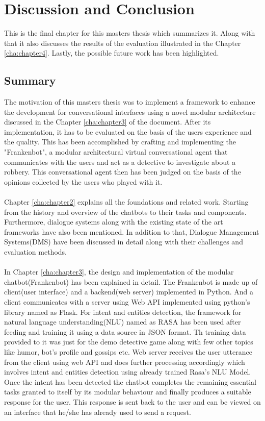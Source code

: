 \chapter{Discussion and Conclusion\label{cha:chapter5}}
This is the final chapter for this masters thesis which summarizes it. Along with that it also discusses the results of the evaluation illustrated in the Chapter \ref{cha:chapter4}. Lastly, the possible future work has been highlighted.

\section{Summary}
The motivation of this masters thesis was to implement a framework to enhance the development for conversational interfaces using a novel modular architecture discussed in the Chapter \ref{cha:chapter3} of the document. After its implementation, it has to be evaluated on the basis of the users experience and the quality. This has been accomplished by crafting and implementing the "Frankenbot", a modular architectural virtual conversational agent that communicates with the users and act as a detective to investigate about a robbery. This conversational agent then has been judged on the basis of the opinions collected by the users who played with it.
\\~\\
Chapter \ref{cha:chapter2} explains all the foundations and related work. Starting from the history and overview of the chatbots to their tasks and components. Furthermore, dialogue systems along with the existing state of the art frameworks have also been mentioned. In addition to that, Dialogue Management Systems(DMS) have been discussed in detail along with their challenges and evaluation methods.
\\~\\
In Chapter \ref{cha:chapter3}, the design and implementation of the modular chatbot(Frankenbot) has been explained in detail. The Frankenbot is made up of client(user interface) and a backend(web server) implemented in Python. And a client communicates with a server using Web API implemented using python's library named as Flask. For intent and entities detection, the framework for natural language understanding(NLU) named as RASA has been used after feeding and training it using a data source in JSON format. Th training data provided to it was just for the demo detective game along with few other topics like humor, bot's profile and gossips etc. Web server receives the user utterance from the client using web API and does further processing accordingly which involves intent and entities detection using already trained Rasa's NLU Model. Once the intent has been detected the chatbot completes the remaining essential tasks granted to itself by its modular behaviour and finally produces a suitable response for the user. This response is sent back to the user and can be viewed on an interface that he/she has already used to send a request.
